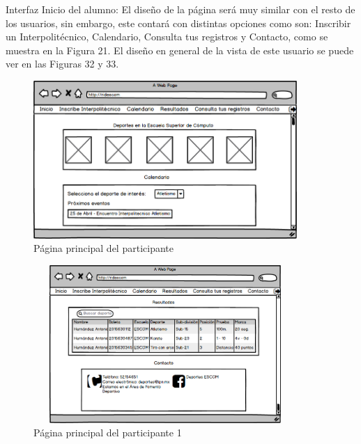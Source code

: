 	\noindent Interfaz Inicio del alumno: El diseño de la página será muy similar con el resto de los usuarios, sin embargo, este contará con distintas opciones como son: Inscribir un Interpolitécnico, Calendario, Consulta tus registros y Contacto, como se muestra en la Figura 21. El diseño en general de la vista de este usuario se puede ver en  las Figuras 32 y 33.
	\begin{figure}[hbt!]
		\centering
		\includegraphics[width=10cm, height=6cm]{Imagenes/Disenos/p13Iniciopaticipante.png}
		\caption{Página principal del participante}
	\end{figure}
	\begin{figure}[hbt!]
		\centering
		\includegraphics[width=10cm, height=6cm]{Imagenes/Disenos/p14Iniciopaticipante1.png}
		\caption{Página principal del participante 1}
	\end{figure}
	
